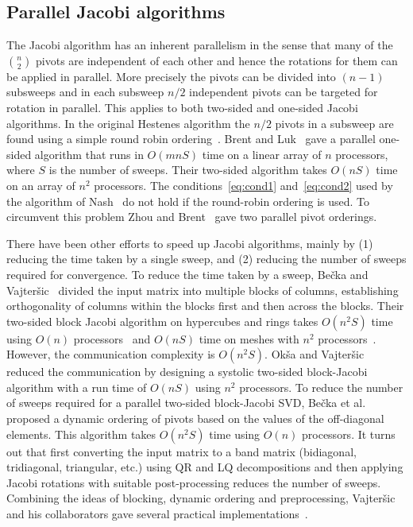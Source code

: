 \documentclass[10pt, conference, compsocconf]{IEEEtran}
\begin{document}
\subsection{Parallel Jacobi algorithms}
\label{sec:paralgo}
 
The Jacobi algorithm has an inherent parallelism in the sense that many of the ${n \choose 2}$ pivots are independent of each other and hence the rotations for them can be applied in parallel. More precisely the pivots can be divided into $(n{-}1)$ subsweeps and in each subsweep $n/2$ independent pivots can be targeted for rotation in parallel. This applies to both two-sided and one-sided Jacobi algorithms. In the original Hestenes algorithm the $n/2$ pivots in a subsweep are found using a simple round robin ordering~\cite{golub2012matrix}. Brent and Luk~\cite{brent1985solution} gave a parallel one-sided algorithm that runs in $O(mnS)$ time on a linear array of $n$ processors, where $S$ is the number of sweeps. Their two-sided algorithm takes $O(nS)$ time on an array of $n^2$ processors. The conditions~\eqref{eq:cond1} and~\eqref{eq:cond2} used by the algorithm of Nash~\cite{nash1975one} do not hold if the round-robin ordering is used. To circumvent this problem Zhou and Brent~\cite{zhou1995parallel} gave two parallel pivot orderings.

There have been other efforts to speed up Jacobi algorithms, mainly by (1) reducing the time taken by a single sweep, and (2) reducing the number of sweeps required for convergence.  To reduce the time taken by a sweep, Be{\v{c}}ka and Vajter{\v{s}}ic~\cite{bevcka1999blocka, bevcka1999blockb} divided the input matrix into multiple blocks of columns, establishing orthogonality of columns within the blocks first and then across the blocks. Their two-sided block Jacobi algorithm on hypercubes and rings takes $O(n^2 S)$ time using $O(n)$ processors~\cite{bevcka1999blocka} and $O(nS)$ time on meshes with $n^2$ processors~\cite{bevcka1999blockb}. However, the communication complexity is $O(n^2 S)$. Ok{\v{s}}a and Vajter{\v{s}}ic~\cite{okvsa2003special} reduced the communication by designing a systolic two-sided block-Jacobi algorithm with a run time of $O(nS)$ using $n^2$ processors. To reduce the number of sweeps required for a parallel two-sided block-Jacobi SVD, Be{\v{c}}ka et al.~\cite{bevcka2002dynamic} proposed a dynamic ordering of pivots based on the values of the off-diagonal elements. This algorithm takes $O(n^2 S)$ time using $O(n)$ processors. It turns out that first converting the input matrix to a band matrix (bidiagonal, tridiagonal, triangular, etc.) using QR and LQ decompositions and then applying Jacobi rotations with suitable post-processing reduces the number of sweeps. Combining the ideas of blocking, dynamic ordering and preprocessing, Vajter{\v{s}}ic and his collaborators gave several practical implementations~\cite{bevcka2013parallel, kudo2016parallel, becka2015parallel}.
\end{document}
